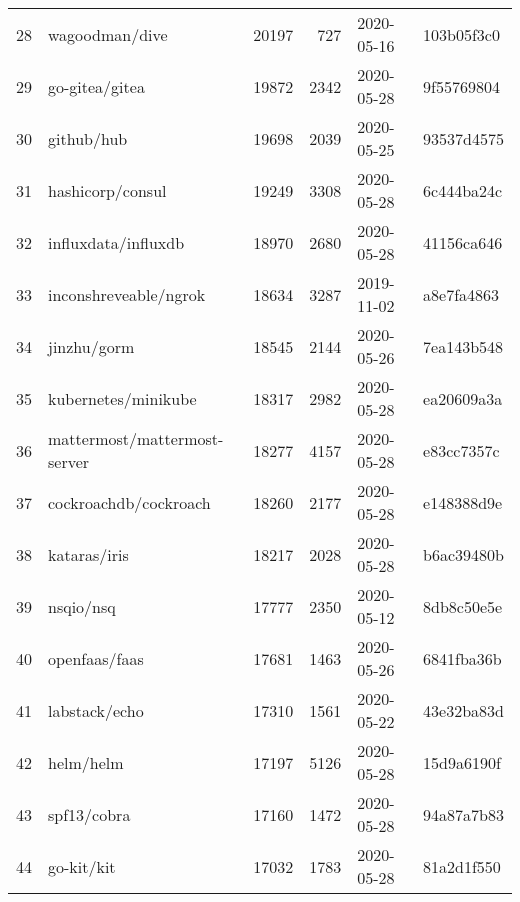 \begin{footnotesize}
\begin{longtable}{llrrll}
        28  &                                     wagoodman/dive &  20197 &    727 & 2020-05-16 &  103b05f3c0 \\
        29  &                                     go-gitea/gitea &  19872 &   2342 & 2020-05-28 &  9f55769804 \\
        30  &                                         github/hub &  19698 &   2039 & 2020-05-25 &  93537d4575 \\
        31  &                                   hashicorp/consul &  19249 &   3308 & 2020-05-28 &  6c444ba24c \\
        32  &                                influxdata/influxdb &  18970 &   2680 & 2020-05-28 &  41156ca646 \\
        33  &                              inconshreveable/ngrok &  18634 &   3287 & 2019-11-02 &  a8e7fa4863 \\
        34  &                                        jinzhu/gorm &  18545 &   2144 & 2020-05-26 &  7ea143b548 \\
        35  &                                kubernetes/minikube &  18317 &   2982 & 2020-05-28 &  ea20609a3a \\
        36  &                       mattermost/mattermost-server &  18277 &   4157 & 2020-05-28 &  e83cc7357c \\
        37  &                              cockroachdb/cockroach &  18260 &   2177 & 2020-05-28 &  e148388d9e \\
        38  &                                       kataras/iris &  18217 &   2028 & 2020-05-28 &  b6ac39480b \\
        39  &                                          nsqio/nsq &  17777 &   2350 & 2020-05-12 &  8db8c50e5e \\
        40  &                                      openfaas/faas &  17681 &   1463 & 2020-05-26 &  6841fba36b \\
        41  &                                      labstack/echo &  17310 &   1561 & 2020-05-22 &  43e32ba83d \\
        42  &                                          helm/helm &  17197 &   5126 & 2020-05-28 &  15d9a6190f \\
        43  &                                        spf13/cobra &  17160 &   1472 & 2020-05-28 &  94a87a7b83 \\
        44  &                                         go-kit/kit &  17032 &   1783 & 2020-05-28 &  81a2d1f550 \\

\end{longtable}
\end{footnotesize}
